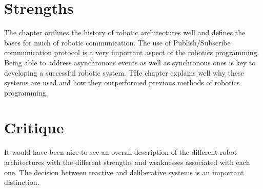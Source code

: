 \documentclass[letterpaper]{article}
\begin{document}
\section*{Strengths}
The chapter outlines the history of robotic architectures well and defines the bases for much of robotic communication. The use of Publish/Subscribe communication protocol is a very important aspect of the robotics programming. Being able to address asynchronous events as well as synchronous ones is key to developing a successful robotic system. THe chapter explains well why these systems are used and how they outperformed previous methods of robotics programming.
\section*{Critique}
It would have been nice to see an overall description of the different robot architectures with the different strengths and weaknesses associated with each one. The decision between reactive and deliberative systems is an important distinction.
\cite{kortenkamp2008robotic}
\end{document}
